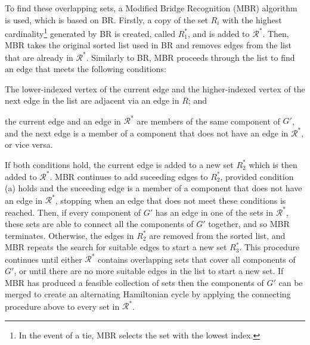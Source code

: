 \documentclass[runningheads]{llncs}
\begin{document}
\noindent To find these overlapping sets, a Modified Bridge Recognition (MBR) algorithm is used, which is based on BR. Firstly, a copy of the set $R_i$ with the highest cardinality\footnote{In the event of a tie, MBR selects the set with the lowest index.} generated by BR is created, called $R^{*}_1$, and is added to $\mathcal{R}^{*}$. Then, MBR takes the original sorted list used in BR and removes edges from the list that are already in $\mathcal{R}^{*}$. Similarly to BR, MBR proceeds through the list to find an edge that meets the following conditions:
\begin{enumerate*}[label={(\alph*)}]
	\item The lower-indexed vertex of the current edge and the higher-indexed vertex of the next edge in the list are adjacent via an edge in $R$; and
	\item the current edge and an edge in $\mathcal{R}^{*}$ are members of the same component of $G'$, and the next edge is a member of a component that does not have an edge in $\mathcal{R}^{*}$, or vice versa.
\end{enumerate*}
If both conditions hold, the current edge is added to a new set $R^{*}_2$ which is then added to $\mathcal{R}^{*}$. MBR continues to add suceeding edges to $R^{*}_2$, provided condition (a) holds and the suceeding edge is a member of a component that does not have an edge in $\mathcal{R}^{*}$, stopping when an edge that does not meet these conditions is reached. Then, if every component of $G'$ has an edge in one of the sets in $\mathcal{R}^{*}$, these sets are able to connect all the components of $G'$ together, and so MBR terminates. Otherwise, the edges in $R^{*}_2$ are removed from the sorted list, and MBR repeats the search for suitable edges to start a new set $R^{*}_3$. This procedure continues until either $\mathcal{R}^{*}$ contains overlapping sets that cover all components of $G'$, or until there are no more suitable edges in the list to start a new set. If MBR has produced a feasible collection of sets then the components of $G'$ can be merged to create an alternating Hamiltonian cycle by applying the connecting procedure above to every set in $\mathcal{R}^{*}$.
\end{document}
